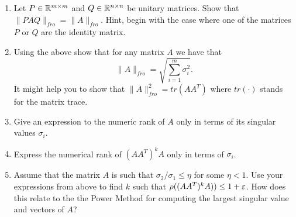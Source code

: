 \documentclass{article}
\begin{document}
\begin{enumerate}
\item Let $P \in {\mathbb{R}}^{m \times m}$ and $Q \in {\mathbb{R}}^{n \times n}$ be unitary matrices.
Show that $\|PAQ\|_{fro} = \|A\|_{fro}$.
Hint, begin with the case where one of the matrices $P$ or $Q$ are the identity matrix.
\item Using the above show that for any matrix $A$ we have that 
\[
\|A\|_{fro} = \sqrt{\sum_{i=1}^{m}\sigma_{i}^{2}}.
\]
It might help you to show that $\|A\|^{2}_{fro} = tr(AA^T)$ where $tr(\cdot)$ stands for the matrix trace.
\item Give an expression to the numeric rank of $A$ only in terms of its singular values $\sigma_i$. 
\item Express the numerical rank of $(AA^T)^{k}A$ only in terms of  $\sigma_i$.
\item Assume that the matrix $A$ is such that $\sigma_2/\sigma_1 \le \eta$ for some $\eta < 1$.
Use your expressions from above to find $k$ such that $\rho((AA^T)^{k}A)) \le  1+ \varepsilon$.
How does this relate to the the Power Method for computing the largest singular value and vectors of $A$?
\end{enumerate}
\end{document}
